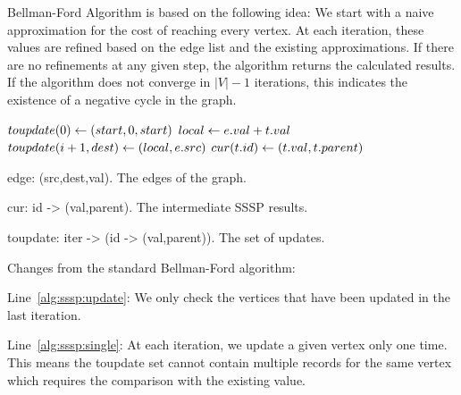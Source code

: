 
Bellman-Ford Algorithm \cite{bellman1958routing,ford1956network} is based on the following idea: We start with a naive approximation for the cost of reaching every vertex. At each iteration, these values are refined based on the edge list and the existing approximations. If there are no refinements at any given step, the algorithm returns the calculated results. If the algorithm does not converge in $|V|-1$ iterations, this indicates the existence of a negative cycle in the graph.


\begin{algorithm} \label{alg:sssp}
\begin{algorithmic}[1]
	\State $toupdate(0) \leftarrow (start,0,start)$
		 \label{alg:sssp:update}
		 		\State $local \leftarrow e.val + t.val$
		 		 \label{alg:sssp:single}
		 			\State $toupdate(i+1,dest) \leftarrow (local,e.src)$
		 		\EndIf
			\EndFor
		\EndFor
		 		\State $cur(t.id) \leftarrow (t.val,t.parent)$
		 	\EndIf
		\EndFor
	\EndFor
\end{algorithmic}
\end{algorithm}

\begin{description}
\item edge: (src,dest,val). The edges of the graph.
\item cur: id -> (val,parent). The intermediate SSSP results.
\item toupdate: iter -> (id -> (val,parent)). The set of updates.
\end{description}

Changes from the standard Bellman-Ford algorithm:

\begin{description}
\item Line~\ref{alg:sssp:update}: We only check the vertices that have been updated in the last iteration.
\item Line~\ref{alg:sssp:single}: At each iteration, we update a given vertex only one time. This means the toupdate set cannot contain multiple records for the same vertex which requires the comparison with the existing value.
\end{description}

